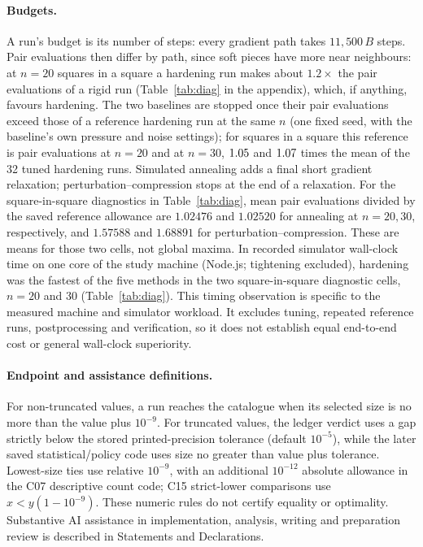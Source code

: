\paragraph{Budgets.} A run's budget is its number of steps: every gradient path takes $11{,}500\,B$ steps. Pair evaluations then differ by path, since soft pieces have more near neighbours: at $n=20$ squares in a square a hardening run makes about $1.2\times$ the pair evaluations of a rigid run (Table~\ref{tab:diag} in the appendix), which, if anything, favours hardening. The two baselines are stopped once their pair evaluations exceed those of a reference hardening run at the same $n$ (one fixed seed, with the baseline's own pressure and noise settings); for squares in a square this reference is \RefEvalsTwenty{} pair evaluations at $n=20$ and \RefEvalsThirty{} at $n=30$, $1.05$ and $1.07$ times the mean of the 32 tuned hardening runs. Simulated annealing adds a final short gradient relaxation; perturbation--compression stops at the end of a relaxation. For the square-in-square diagnostics in Table~\ref{tab:diag}, mean pair evaluations divided by the saved reference allowance are $1.02476$ and $1.02520$ for annealing at $n=20,30$, respectively, and $1.57588$ and $1.68891$ for perturbation--compression. These are means for those two cells, not global maxima. In recorded simulator wall-clock time on one core of the study machine (Node.js; tightening excluded), hardening was the fastest of the five methods in the two square-in-square diagnostic cells, $n=20$ and 30 (Table~\ref{tab:diag}). This timing observation is specific to the measured machine and simulator workload. It excludes tuning, repeated reference runs, postprocessing and verification, so it does not establish equal end-to-end cost or general wall-clock superiority.

\paragraph{Endpoint and assistance definitions.} For non-truncated values, a run reaches the catalogue when its selected size is no more than the value plus $10^{-9}$. For truncated values, the ledger verdict uses a gap strictly below the stored printed-precision tolerance (default $10^{-5}$), while the later saved statistical/policy code uses size no greater than value plus tolerance. Lowest-size ties use relative $10^{-9}$, with an additional $10^{-12}$ absolute allowance in the C07 descriptive count code; C15 strict-lower comparisons use $x<y(1-10^{-9})$. These numeric rules do not certify equality or optimality. Substantive AI assistance in implementation, analysis, writing and preparation review is described in Statements and Declarations.
